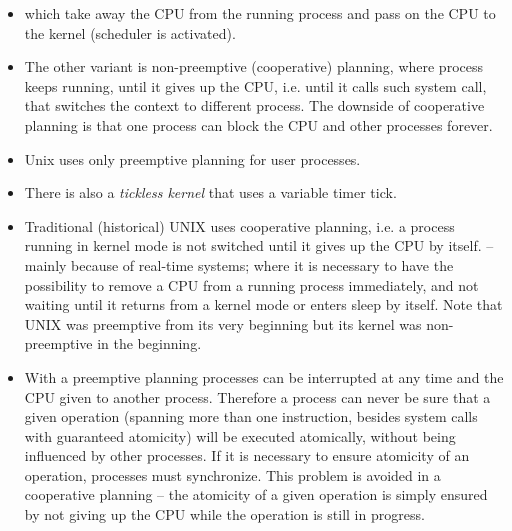 \begin{itemize}
\item {}
which take away the CPU from the running process and pass on the CPU
to the kernel (scheduler is activated).
\item The other variant is non-preemptive (cooperative) planning, where process
keeps running, until it gives up the CPU, i.e. until it calls such system call,
that switches the context to different process. The downside of cooperative
planning is that one process can block the CPU and other processes forever.
\item Unix uses only preemptive planning for user processes.
\item There is also a \emph{tickless kernel} that uses a variable timer tick.
\item Traditional (historical) UNIX  uses cooperative planning,
i.e. a process running in kernel mode is not switched until it gives up the CPU
by itself.
 -- mainly because of real-time
systems; where it is necessary to have the possibility to remove a CPU from
a running process immediately, and not waiting until it returns from a kernel
mode or enters sleep by itself. Note that UNIX was preemptive from its very
beginning but its kernel was non-preemptive in the beginning.
\item With a preemptive planning processes can be interrupted at any time and
the CPU given to another process. Therefore a process can never be sure
that a given operation (spanning more than one instruction, besides system calls
with guaranteed atomicity) will be executed atomically, without being
influenced by other processes. If it is necessary to ensure atomicity of an
operation, processes must synchronize. This problem is avoided in a cooperative
planning -- the atomicity of a given operation is simply ensured by not giving
up the CPU while the operation is still in progress.
\end{itemize}



